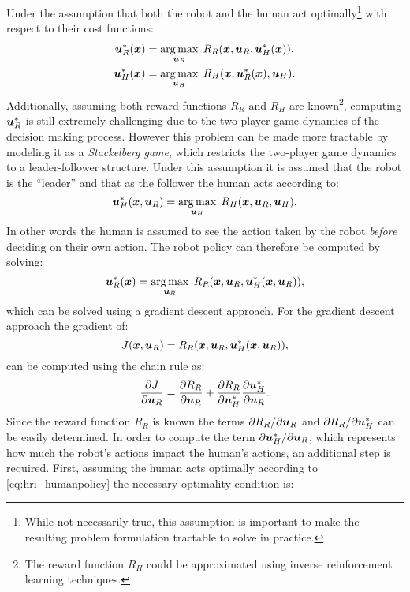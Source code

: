 Under the assumption that both the robot and the human act optimally\footnote{While not necessarily true, this assumption is important to make the resulting problem formulation tractable to solve in practice.} with respect to their cost functions:
\begin{equation*}
\begin{split}
\bm{u}_R^*(\bm{x}) &= \underset{\bm{u}_R}{\arg\max} \:\: R_R(\bm{x}, \bm{u}_R, \bm{u}_H^*(\bm{x})), \\
\bm{u}_H^*(\bm{x}) &= \underset{\bm{u}_H}{\arg\max} \:\: R_H(\bm{x}, \bm{u}_R^*(\bm{x}), \bm{u}_H). \\
\end{split}
\end{equation*}
Additionally, assuming both reward functions $R_R$ and $R_H$ are known\footnote{The reward function $R_H$ could be approximated using inverse reinforcement learning techniques.}, computing $\bm{u}_R^*$ is still extremely challenging due to the two-player game dynamics of the decision making process. However this problem can be made more tractable by modeling it as a \textit{Stackelberg game}, which restricts the two-player game dynamics to a leader-follower structure. Under this assumption it is assumed that the robot is the ``leader'' and that as the follower the human acts according to:
\begin{equation} \label{eq:hri_humanpolicy}
\bm{u}_H^*(\bm{x}, \bm{u}_R) = \underset{\bm{u}_H}{\arg\max} \:\: R_H(\bm{x}, \bm{u}_R, \bm{u}_H).
\end{equation}
In other words the human is assumed to see the action taken by the robot \textit{before} deciding on their own action.
The robot policy can therefore be computed by solving:
\begin{equation} \label{eq:hri_robotpolicy}
\bm{u}_R^*(\bm{x}) = \underset{\bm{u}_R}{\arg\max} \:\: R_R(\bm{x}, \bm{u}_R, \bm{u}_H^*(\bm{x}, \bm{u}_R)),
\end{equation}
which can be solved using a gradient descent approach. For the gradient descent approach the gradient of:
\begin{equation*}
J(\bm{x}, \bm{u}_R) = R_R(\bm{x}, \bm{u}_R, \bm{u}_H^*(\bm{x}, \bm{u}_R)),
\end{equation*}
can be computed using the chain rule as:
\begin{equation*}
\frac{\partial J}{\partial \bm{u}_R} = \frac{\partial R_R}{\partial \bm{u}_R} + \frac{\partial R_R}{\partial \bm{u}_H^*}\frac{\partial \bm{u}_H^*}{\partial \bm{u}_R}.
\end{equation*}
Since the reward function $R_R$ is known the terms $\partial R_R/\partial \bm{u}_R$ and $\partial R_R/\partial \bm{u}_H^*$ can be easily determined. In order to compute the term $\partial \bm{u}_H^*/\partial \bm{u}_R$, which represents how much the robot's actions impact the human's actions, an additional step is required. First, assuming the human acts optimally according to \eqref{eq:hri_humanpolicy} the necessary optimality condition is:
